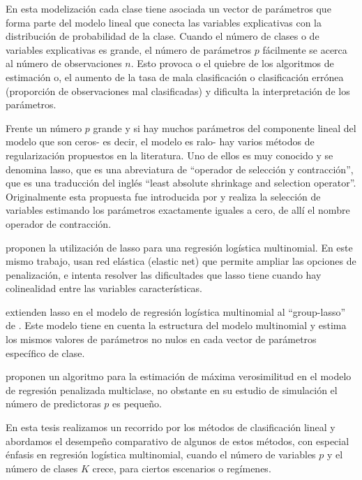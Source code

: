 \documentclass{report}
\begin{document}
En esta modelización cada clase tiene asociada un vector de parámetros que forma parte del modelo lineal que conecta las variables explicativas con la distribución de probabilidad de la clase. Cuando el número de clases o de variables explicativas es grande, el número de parámetros $p$ fácilmente se acerca al número de observaciones $n$. Esto provoca o el quiebre de los algoritmos de estimación o,  el aumento de la tasa de mala clasificación o clasificación errónea (proporción de observaciones mal clasificadas) y dificulta la interpretación de los parámetros.
 


Frente un número $p$ grande y si hay muchos parámetros del componente lineal del modelo que son ceros- es decir, el modelo es ralo- hay varios métodos de regularización propuestos en la literatura. Uno de ellos es muy conocido y se denomina lasso, que es una abreviatura de  ``operador de selección y contracción'', que es una traducción del inglés ``least absolute shrinkage and selection operator''.  Originalmente esta propuesta fue introducida por \cite{tibshi1996} y realiza la selección de variables estimando los parámetros exactamente iguales a cero, de allí el nombre operador de contracción. 

\cite{friedman2010} proponen la utilización de lasso para una regresión logística multinomial. En este mismo trabajo, \cite{friedman2010} usan red elástica (elastic net) que permite ampliar las opciones de penalización, e intenta resolver las dificultades que lasso tiene cuando hay colinealidad entre las variables características.  

\cite{vincent2014} extienden lasso en el modelo de regresión logística multinomial al ``group-lasso'' de \cite{yuan2006}. Este modelo tiene en cuenta la estructura del modelo multinomial y estima los mismos valores de parámetros no nulos en cada vector de parámetros específico de clase. 
 

\cite{nibbering2022} proponen un algoritmo para la estimación de máxima verosimilitud en el modelo de regresión penalizada multiclase, no obstante en su estudio de simulación el número de predictoras $p$ es pequeño.




 En esta tesis realizamos un recorrido por los métodos de clasificación lineal y abordamos el desempeño comparativo de algunos de estos métodos, con especial énfasis en regresión logística multinomial,  cuando el número de variables $p$ y el número de clases $K$ crece, para ciertos escenarios o regímenes.  	 
\end{document}
